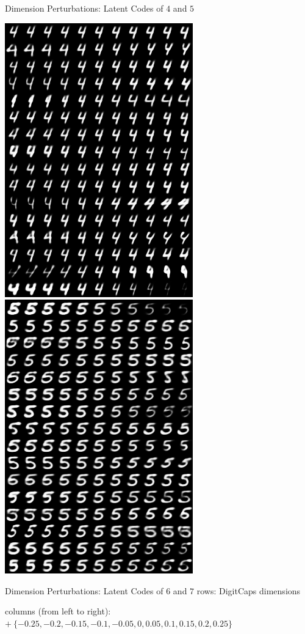 \documentclass{beamer}
\begin{document}
{\begin{frame}{Dimension Perturbations: Latent Codes of $4$ and $5$}
      \begin{center}
        \includegraphics[width=.4\textwidth]{../img/recons-capsnet-keras/manipulate-4.png}
        \includegraphics[width=.4\textwidth]{../img/recons-capsnet-keras/manipulate-5.png}
      \end{center}
    \end{frame}

    \begin{frame}{Dimension Perturbations: Latent Codes of $6$ and $7$}
      \tiny
      rows: DigitCaps dimensions

      columns (from left to right): $+ \  \{ -0.25, -0.2, -0.15, -0.1, -0.05, 0, 0.05, 0.1, 0.15, 0.2, 0.25 \}$


\end{frame}}
\end{document}
